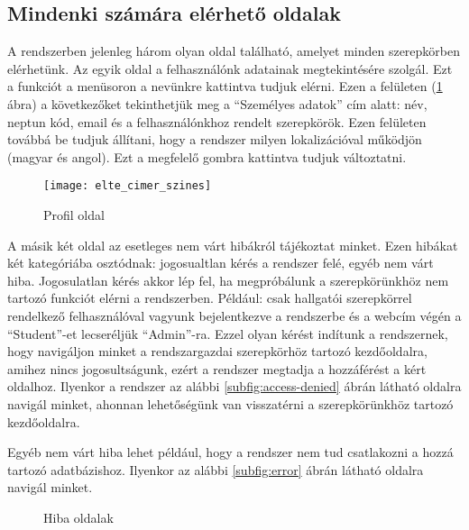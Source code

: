\subsection{Mindenki számára elérhető oldalak}
\label{step:mindenkinek-elerheto-oldal}
A rendszerben jelenleg három olyan oldal található, amelyet minden szerepkörben elérhetünk. Az egyik oldal a felhasználónk adatainak megtekintésére szolgál. Ezt a funkciót a menüsoron a nevünkre kattintva tudjuk elérni. Ezen a felületen (\ref{fig:profile} ábra) a következőket tekinthetjük meg a ``Személyes adatok'' cím alatt: név, neptun kód, email és a felhasználónkhoz rendelt szerepkörök. Ezen felületen továbbá be tudjuk állítani, hogy a rendszer milyen lokalizációval működjön (magyar és angol). Ezt a megfelelő gombra kattintva tudjuk változtatni.
\begin{figure}[H]
	\centering
	\texttt{[image: elte\_cimer\_szines]}
	\caption{Profil oldal}
	\label{fig:profile}
\end{figure}
A másik két oldal az esetleges nem várt hibákról tájékoztat minket. Ezen hibákat két kategóriába osztódnak: jogosualtlan kérés a rendszer felé, egyéb nem várt hiba. Jogosulatlan kérés akkor lép fel, ha megpróbálunk a szerepkörünkhöz nem tartozó funkciót elérni a rendszerben. Például: csak hallgatói szerepkörrel rendelkező felhasználóval vagyunk bejelentkezve a rendszerbe és a webcím végén a ``Student''-et lecseréljük ``Admin''-ra. Ezzel olyan kérést indítunk a rendszernek, hogy navigáljon minket a rendszargazdai szerepkörhöz tartozó kezdőoldalra, amihez nincs jogosultságunk, ezért a rendszer megtadja a hozzáférést a kért oldalhoz. Ilyenkor a rendszer az alábbi \ref{subfig:access-denied} ábrán látható oldalra navigál minket, ahonnan lehetőségünk van visszatérni a szerepkörünkhöz tartozó kezdőoldalra.

Egyéb nem várt hiba lehet például, hogy a rendszer nem tud csatlakozni a hozzá tartozó adatbázishoz. Ilyenkor az alábbi \ref{subfig:error} ábrán látható oldalra navigál minket.
\begin{figure}[H]
	\centering
	\hspace{5pt}
	\caption{Hiba oldalak}
	\label{fig:errors}
\end{figure}